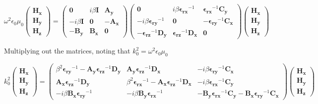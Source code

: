 \documentclass[]{article}
\begin{document}
\begin{equation*}
\omega^2 \epsilon_0 \mu_0
\begin{pmatrix}
\mathbf{H_x} \\
\mathbf{H_y} \\
\mathbf{H_z}
\end{pmatrix}
=
\begin{pmatrix}
\mathbf{0} & i \beta \mathbf{I} & \mathbf{A_y} \\
-i \beta \mathbf{I} & \mathbf{0} & -\mathbf{A_x} \\
-\mathbf{B_y} & \mathbf{B_x} & \mathbf{0}
\end{pmatrix}
\begin{pmatrix}
\mathbf{0} & i \beta \mathbf{\epsilon_{rx}}^{-1} & \mathbf{\epsilon_{rx}}^{-1} \mathbf{C_y} \\
-i \beta \mathbf{\epsilon_{ry}}^{-1} & \mathbf{0} & - \mathbf{\epsilon_{ry}}^{-1} \mathbf{C_x} \\
-\mathbf{\epsilon_{rz}}^{-1} \mathbf{D_y} & \mathbf{\epsilon_{rz}}^{-1} \mathbf{D_x} & \mathbf{0} 
\end{pmatrix}
\begin{pmatrix}
\mathbf{H_x} \\
\mathbf{H_y} \\
\mathbf{H_z}
\end{pmatrix}
\end{equation*}

Multiplying out the matrices, noting that $k_0^2 = \omega^2 \epsilon_0 \mu_0$

\begin{equation*}
k_0^2
\begin{pmatrix}
\mathbf{H_x} \\
\mathbf{H_y} \\
\mathbf{H_z}
\end{pmatrix}
=
\begin{pmatrix}
\beta^2 \mathbf{\epsilon_{ry}}^{-1} - \mathbf{A_y} \mathbf{\epsilon_{rz}}^{-1} \mathbf{D_y} 
&
\mathbf{A_y} \mathbf{\epsilon_{rz}}^{-1} \mathbf{D_x}
&
-i \beta \mathbf{\epsilon_{ry}}^{-1} \mathbf{C_x}
\\
\mathbf{A_x} \mathbf{\epsilon_{rz}}^{-1} \mathbf{D_y} 
& 
\beta^2 \mathbf{\epsilon_{rx}}^{-1} - \mathbf{A_x} \mathbf{\epsilon_{rz}}^{-1} \mathbf{D_x}
&
-i \beta \mathbf{\epsilon_{rx}}^{-1} \mathbf{C_y}
\\
-i \beta \mathbf{B_x} \mathbf{\epsilon_{ry}}^{-1}
& 
-i \beta \mathbf{B_y} \mathbf{\epsilon_{rx}}^{-1}
&
-\mathbf{B_y} \mathbf{\epsilon_{rx}}^{-1} \mathbf{C_y} - \mathbf{B_x} \mathbf{\epsilon_{ry}}^{-1} \mathbf{C_x}
\end{pmatrix}
\begin{pmatrix}
\mathbf{H_x} \\
\mathbf{H_y} \\
\mathbf{H_z}
\end{pmatrix}
\end{equation*}
\end{document}
